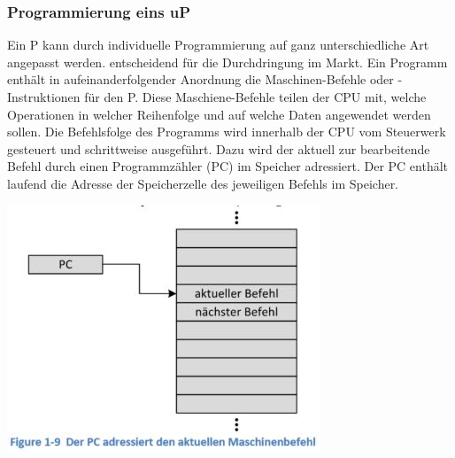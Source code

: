 \subsubsection{Programmierung eins uP}
\begin{multicols}{2}
\begin{minipage}{\linewidth}
    Ein \mu P kann durch individuelle Programmierung auf ganz unterschiedliche Art angepasst werden. \newline
    \rightarrow entscheidend für die Durchdringung im Markt.\newline
    Ein Programm enthält in aufeinanderfolgender Anordnung die Maschinen-Befehle oder -Instruktionen für den \mu P. Diese Maschiene-Befehle teilen der CPU mit, welche Operationen in welcher Reihenfolge und auf welche Daten angewendet werden sollen. \newline
    Die Befehlsfolge des Programms wird innerhalb der CPU vom Steuerwerk gesteuert und schrittweise ausgeführt. Dazu wird der aktuell zur bearbeitende Befehl durch einen Programmzähler (PC) im Speicher adressiert.\newline
    Der PC enthält laufend die Adresse der Speicherzelle des jeweiligen Befehls im Speicher.
\end{minipage}

\includegraphics[width=\linewidth]{images/uPPC}
\end{multicols}
    
